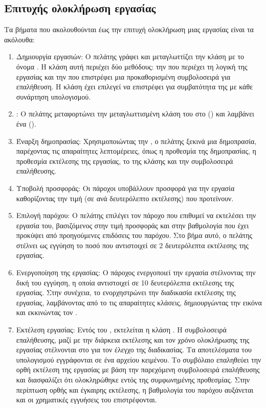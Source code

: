 \subsection{Επιτυχής ολοκλήρωση εργασίας }
Τα βήματα που ακολουθούνται έως την επιτυχή ολοκλήρωση μιας εργασίας είναι τα ακόλουθα:
\begin{enumerate}
    \item Δημιουργία εργασιών: Ο πελάτης γράφει και μεταγλωττίζει την κλάση  με το όνομα \textit{}. Η κλάση αυτή περιέχει δύο  μεθόδους: την \textit{} που περιέχει τη λογική της εργασίας και την \textit{} που επιστρέφει μια προκαθορισμένη συμβολοσειρά για επαλήθευση. Η κλάση \textit{} έχει επιλεγεί να επιστρέφει  για συμβατότητα της  με κάθε συνάρτηση υπολογισμού.
    \item {}: Ο πελάτης μεταφορτώνει την μεταγλωττισμένη κλάση του στο  () και λαμβάνει ένα  ().
    \item Έναρξη δημοπρασίας: Χρησιμοποιώντας την , ο πελάτης ξεκινά μια δημοπρασία, παρέχοντας τις απαραίτητες λεπτομέρειες, όπως η προθεσμία της δημοπρασίας, η προθεσμία εκτέλεσης της εργασίας, το  της  κλάσης και την συμβολοσειρά επαλήθευσης.
    \item Υποβολή προσφοράς: Οι πάροχοι υποβάλλουν προσφορά για την εργασία καθορίζοντας την τιμή (σε  ανά δευτερόλεπτο εκτέλεσης) που προτείνουν.
    \item Επιλογή παρόχου: Ο πελάτης επιλέγει τον πάροχο που επιθυμεί να εκτελέσει την εργασία του, βασιζόμενος στην τιμή προσφοράς και στην βαθμολογία που έχει προκύψει από προηγούμενες επιδόσεις του παρόχου. Στο βήμα αυτό, ο πελάτης στέλνει ως εγγύηση το ποσό που αντιστοιχεί σε 2 δευτερόλεπτα εκτέλεσης της εργασίας.
    \item Ενεργοποίηση της εργασίας: Ο πάροχος ενεργοποιεί την εργασία στέλνοντας την δική του εγγύηση, η οποία αντιστοιχεί σε 10 δευτερόλεπτα εκτέλεσης της εργασίας. Στην συνέχεια, το  ενορχηστρώνει την διαδικασία εκτέλεσης της εργασίας, λαμβάνοντας από το  τις απαραίτητες κλάσεις, δημιουργώντας την εικόνα \textit{} και εκκινώντας τον .
    \item Εκτέλεση εργασίας: Εντός του , εκτελείται η κλάση . Η συμβολοσειρά επαλήθευσης, μαζί με την διάρκεια εκτέλεσης και τον χρόνο ολοκλήρωσης της εργασίας στέλνονται στο  \textit{} για τον έλεγχο της διαδικασίας. Τα αποτελέσματα του υπολογισμού εγγράφονται σε ένα αρχείου κειμένου. Το συμβόλαιο επαληθεύει την ορθή εκτέλεση της εργασίας με βάση την παρεχόμενη συμβολοσειρά επαλήθευσης και διασφαλίζει ότι ολοκληρώθηκε εντός της συμφωνημένης προθεσμίας. Στην περίπτωση ορθής και έγκαιρης εκτέλεσης, η βαθμολογία του παρόχου αυξάνεται και οι χρηματικές εγγυήσεις του επιστρέφονται.

\end{enumerate}
